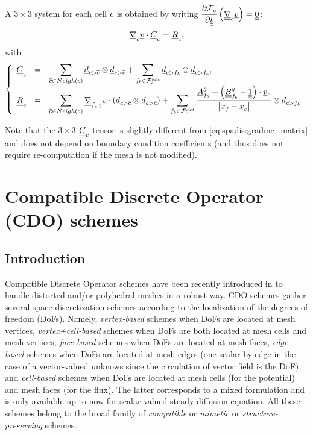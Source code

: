 A $3\times 3$ system for each cell $c$
is obtained by writing  $\dfrac{\partial \mathcal{F}_c}{\partial \underline{\underline{t}} }
\left( \underline{\underline{{\nabla}}}_c \underline{v} \right)= \underline{\underline{0}}$:
%
\begin{equation}\label{eq:spadis:gradmv_matrix}
\underline{\underline{{\nabla}}}_c \underline{v} \cdot \underline{\underline{C}}_{c} = \underline{\underline{R}}_{c} ,
\end{equation}
with
%
\begin{equation}
\left\{
\begin{array}{r c l}
\underline{\underline{C}}_{c} &=&
\displaystyle
 \sum\limits_{{\overline{c}} \in Neigh\left(c\right) }
 \underline{d}_{{c > {\overline{c}}}} \otimes \underline{d}_{{c > {\overline{c}}}}
+
\sum\limits_{{{f}_{b}} \in \mathcal{F}^{ext}_{c}}
\underline{d}_{c>{{f}_{b}}} \otimes  \underline{d}_{c>{{f}_{b}}} ,
\\
\underline{\underline{R}}_{c} &=&
\displaystyle
\sum\limits_{ {\overline{c}} \in Neigh\left(c\right) }
 \underline{\underline{{\nabla}}}_{{{f}_{c|{\overline{c}}}}} \underline{v}   \cdot \left( \underline{d}_{{c > {\overline{c}}}} \otimes \underline{d}_{{c > {\overline{c}}}} \right)
+
\sum\limits_{ {{f}_{b}} \in \mathcal{F}^{ext}_{c}}
\dfrac{
\underline{A}^g_{{{f}_{b}}} +\left(\underline{\underline{B}}^g_{{{f}_{b}}} -\underline{\underline{1}} \right) \cdot \underline{v}_{c}
}{
\left| \underline{x}_{{f}} - {\underline{x}_{c}} \right|
}
\otimes
\underline{d}_{c>{{f}_{b}}} .
\end{array}\right.
\end{equation}
%

\begin{remark}
Note that the $3\times3$ $\underline{\underline{C}}_{c}$ tensor is  slightly different from \eqref{eq:spadis:gradmc_matrix} and does not depend
 on boundary condition coefficients (and thus does not require re-computation if the mesh is not modified).
\end{remark}

\section{Compatible Discrete Operator (CDO) schemes}

\subsection{Introduction }

Compatible Discrete Operator schemes have been recently introduced in \CS to
handle distorted and/or polyhedral meshes in a robust way. CDO schemes gather
several space discretization schemes according to the localization of the
degrees of freedom (DoFs). Namely, \emph{vertex-based} schemes when DoFs are
located at mesh vertices, \emph{vertex+cell-based} schemes when DoFs are both
located at mesh cells and mesh vertices, \emph{face-based} schemes when DoFs
are located at mesh faces, \emph{edge-based} schemes when DoFs are located at
mesh edges (one scalar by edge in the case of a vector-valued unknows since the
circulation of vector field is the DoF) and \emph{cell-based} schemes when DoFs
are located at mesh cells (for the potential) and mesh faces (for the
flux). The latter corresponds to a mixed formulation and is only available up
to now for scalar-valued steady diffusion equation.  All these schemes belong
to the broad family of \emph{compatible} or \emph{mimetic} or
\emph{structure-preserving} schemes.

